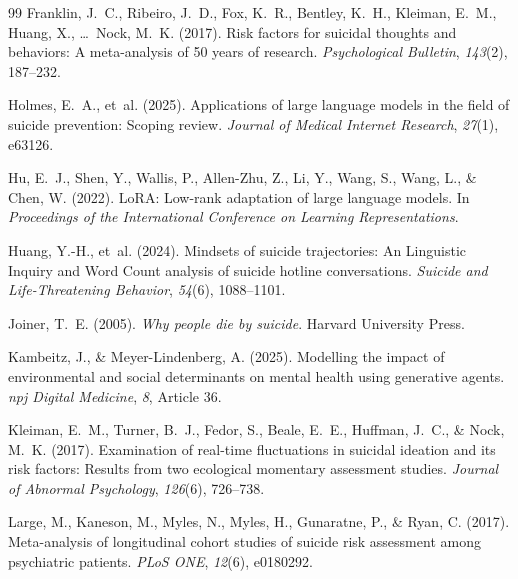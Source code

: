 \documentclass[review,12pt,authoryear]{elsarticle}
\begin{document}
\begin{thebibliography}{99}
Franklin, J.~C., Ribeiro, J.~D., Fox, K.~R., Bentley, K.~H., Kleiman, E.~M., Huang, X., \ldots\ Nock, M.~K. (2017).
\newblock Risk factors for suicidal thoughts and behaviors: {A} meta-analysis of 50 years of research.
\newblock \textit{Psychological Bulletin}, \textit{143}(2), 187--232.

Holmes, E.~A., et~al. (2025).
\newblock Applications of large language models in the field of suicide prevention: {S}coping review.
\newblock \textit{Journal of Medical Internet Research}, \textit{27}(1), e63126.

Hu, E.~J., Shen, Y., Wallis, P., Allen-Zhu, Z., Li, Y., Wang, S., Wang, L., \& Chen, W. (2022).
\newblock Lo{RA}: {L}ow-rank adaptation of large language models.
\newblock In \textit{Proceedings of the International Conference on Learning Representations}.

Huang, Y.-H., et~al. (2024).
\newblock Mindsets of suicide trajectories: {A}n {L}inguistic {I}nquiry and {W}ord {C}ount analysis of suicide hotline conversations.
\newblock \textit{Suicide and Life-Threatening Behavior}, \textit{54}(6), 1088--1101.

Joiner, T.~E. (2005).
\newblock \textit{Why people die by suicide}.
\newblock Harvard University Press.

Kambeitz, J., \& Meyer-Lindenberg, A. (2025).
\newblock Modelling the impact of environmental and social determinants on mental health using generative agents.
\newblock \textit{npj Digital Medicine}, \textit{8}, Article 36.

Kleiman, E.~M., Turner, B.~J., Fedor, S., Beale, E.~E., Huffman, J.~C., \& Nock, M.~K. (2017).
\newblock Examination of real-time fluctuations in suicidal ideation and its risk factors: {R}esults from two ecological momentary assessment studies.
\newblock \textit{Journal of Abnormal Psychology}, \textit{126}(6), 726--738.

Large, M., Kaneson, M., Myles, N., Myles, H., Gunaratne, P., \& Ryan, C. (2017).
\newblock Meta-analysis of longitudinal cohort studies of suicide risk assessment among psychiatric patients.
\newblock \textit{PLoS ONE}, \textit{12}(6), e0180292.




\end{thebibliography}
\end{document}
